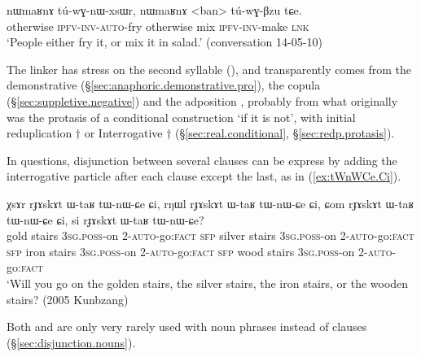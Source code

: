 \begin{exe}
\ex \label{ex:nWmaRnA.tuwGnWxsWr}
\gll nɯmaʁnɤ tú-wɣ-nɯ-xsɯr, nɯmaʁnɤ <ban> tú-wɣ-βzu tɕe. \\
otherwise \textsc{ipfv}-\textsc{inv}-\textsc{auto}-fry otherwise mix \textsc{ipfv}-\textsc{inv}-make \textsc{lnk} \\
\glt `People either fry it, or mix it in salad.' (conversation 14-05-10)
\end{exe} 

The linker  has stress on the second syllable (), and transparently comes from the demonstrative  (§\ref{sec:anaphoric.demonstrative.pro}), the copula  (§\ref{sec:suppletive.negative}) and the adposition , probably from what originally was the protasis of a conditional construction `if it is not', with initial reduplication $\dagger$ or Interrogative $\dagger$ (§\ref{sec:real.conditional}, §\ref{sec:redp.protasis}). 

In questions, disjunction between several clauses can be express by adding the interrogative particle  after each clause except the last, as in (\ref{ex:tWnWCe.Ci}).

\begin{exe}
\ex \label{ex:tWnWCe.Ci}
\gll χsɤr rɟɤskɤt ɯ-taʁ tɯ-nɯ-ɕe ɕi, rŋɯl rɟɤskɤt ɯ-taʁ tɯ-nɯ-ɕe ɕi, ɕom rɟɤskɤt ɯ-taʁ tɯ-nɯ-ɕe ɕi, 
si rɟɤskɤt ɯ-taʁ tɯ-nɯ-ɕe? \\
gold stairs \textsc{3sg}.\textsc{poss}-on 2-\textsc{auto}-go:\textsc{fact} \textsc{sfp} silver stairs \textsc{3sg}.\textsc{poss}-on 2-\textsc{auto}-go:\textsc{fact} \textsc{sfp} iron stairs \textsc{3sg}.\textsc{poss}-on 2-\textsc{auto}-go:\textsc{fact} \textsc{sfp} wood stairs \textsc{3sg}.\textsc{poss}-on 2-\textsc{auto}-go:\textsc{fact} \\
\glt `Will you go on the golden stairs, the silver stairs, the iron stairs, or the wooden stairs? (2005 Kunbzang)
\end{exe} 

Both  and  are only very rarely used with noun phrases instead of clauses (§\ref{sec:disjunction.nouns}).

